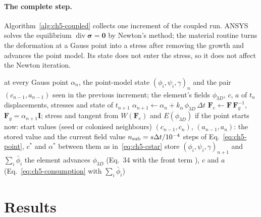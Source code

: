 \paragraph{The complete step.} Algorithm~\ref{alg:ch5-coupled} collects one increment of the coupled
run. ANSYS solves the equilibrium $\operatorname{div}\boldsymbol\sigma=\mathbf 0$ by Newton's method;
the material routine turns the deformation at a Gauss point into a stress after removing the growth and
advances the point model. Its state does not enter the stress, so it does not affect the Newton
iteration.

\begin{algorithm}[htbp]
\caption{One increment $t_n\to t_{n+1}$ of the coupled run}
\label{alg:ch5-coupled}
\begin{algorithmic}[1]
\REQUIRE at every Gauss point $\alpha_n$, the point-model state $(\phi_i,\psi_i,\gamma)_n$ and the pair
  $(c_{n-1},a_{n-1})$ seen in the previous increment; the element's fields $\phi_{3D}$, $c$, $a$ of $t_n$
\ENSURE displacements, stresses and state of $t_{n+1}$
    \STATE $\alpha_{n+1}\leftarrow\alpha_n+k_\alpha\,\phi_{3D}\,\Delta t$ 
    \STATE $\mathbf F_e\leftarrow\mathbf F\,\mathbf F_g^{-1}$, $\mathbf F_g=\alpha_{n+1}\mathbf I$; stress and tangent from $W(\mathbf F_e)$ and $E(\phi_{3D})$
        \STATE if the point starts now: start values (seed or colonised neighbours)
        \STATE $(c_{n-1},c_n)$, $(a_{n-1},a_n)$: the stored value and the current field value
        \STATE $n_{\rm sub}=s\Delta t/10^{-4}$ steps of Eq.~\eqref{eq:ch5-point}, $c^*$ and $\alpha^*$ between them as in~\eqref{eq:ch5-cstar}
        \STATE store $(\phi_i,\psi_i,\gamma)_{n+1}$ and $\sum_i\bar\phi_i$
      \ENDIF
    \ENDIF
  \ENDFOR
{}
\STATE the element advances $\phi_{3D}$ (Eq.~34 with the front term \fterm{}), $c$ and $a$ (Eq.~\eqref{eq:ch5-consumption} with $\sum_i\bar\phi_i$)
\end{algorithmic}
\end{algorithm}

\section{Results}
\label{sec:ch5-results}

